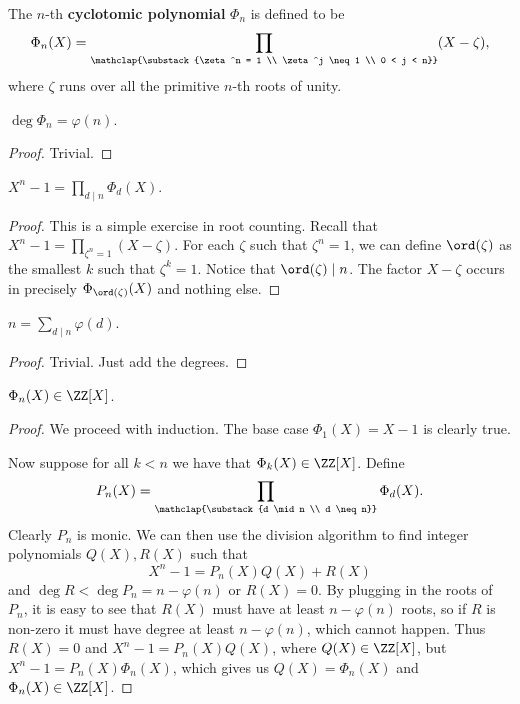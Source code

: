 \documentclass{article}
\begin{document}
\begin{df}
The $n$-th \textbf{cyclotomic polynomial} $\Phi_n$ is defined to be
\[ \Phi_n(X) = \prod_{\mathclap{\substack{\zeta^n = 1 \\ \zeta^j \neq 1 \\ 0 < j
< n}}} (X - \zeta), \]
where $\zeta$ runs over all the primitive $n$-th roots of unity.
\end{df}

\begin{prop}
$\deg \Phi_n = \varphi(n)$.
\end{prop}

\begin{proof}
Trivial.
\end{proof}

\begin{prop}
$X^n - 1 = \prod_{d \mid n} \Phi_d(X)$.
\end{prop}

\begin{proof}
This is a simple exercise in root counting. Recall that $X^n - 1 =
\prod_{\zeta^n = 1} (X - \zeta)$. For each $\zeta$ such that $\zeta^n = 1$, we
can define $\ord(\zeta)$ as the smallest $k$ such that $\zeta^k = 1$. Notice
that $\ord(\zeta) \mid n$. The factor $X - \zeta$ occurs in precisely
$\Phi_{\ord(\zeta)}(X)$ and nothing else.
\end{proof}

\begin{cor}
$n = \sum_{d \mid n} \varphi(d)$.
\end{cor}

\begin{proof}
Trivial. Just add the degrees.
\end{proof}

\begin{prop}
$\Phi_n(X) \in \ZZ[X]$.
\end{prop}

\begin{proof}
We proceed with induction. The base case $\Phi_1(X) = X - 1$ is clearly true.

Now suppose for all $k < n$ we have that $\Phi_k(X) \in \ZZ[X]$. Define
\[ P_n(X) = \prod_{\mathclap{\substack{d \mid n \\ d \neq n}}} \Phi_d(X). \]
Clearly $P_n$ is monic. We can then use the division algorithm to find
integer polynomials $Q(X), R(X)$ such that
\[ X^n - 1 = P_n(X) Q(X) + R(X) \]
and $\deg R < \deg P_n = n - \varphi(n)$ or $R(X) = 0$. By plugging in the roots
of $P_n$, it is easy to see that $R(X)$ must have at least $n - \varphi(n)$
roots, so if $R$ is non-zero it must have degree at least $n - \varphi(n)$,
which cannot happen. Thus $R(X) = 0$ and $X^n - 1 = P_n(X) Q(X)$, where $Q(X)
\in \ZZ[X]$, but $X^n - 1 = P_n(X) \Phi_n(X)$, which gives us $Q(X) = \Phi_n(X)$
and $\Phi_n(X) \in \ZZ[X]$.
\end{proof}
\end{document}
